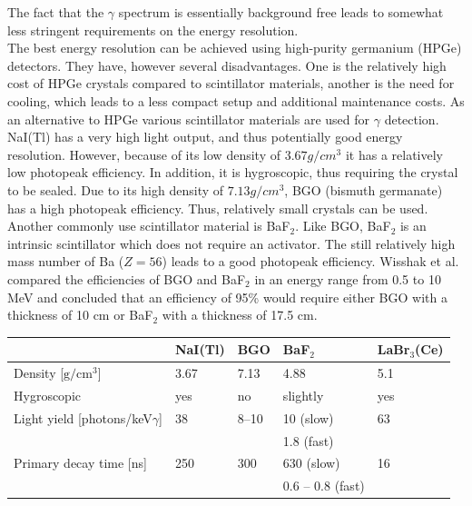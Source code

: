 The fact that the $\gamma$ spectrum is essentially background free leads to somewhat less stringent requirements on the energy resolution. \\
The best energy resolution can be achieved using high-purity germanium (HPGe) detectors. They have, however several disadvantages. One is the relatively high cost of HPGe crystals compared to scintillator materials, another is the need for cooling, which leads to a less compact setup and additional maintenance costs. As an alternative to HPGe various scintillator materials are used for $\gamma$ detection. NaI(Tl) has a very high light output, and thus potentially good energy resolution. However, because of its low density of $3.67\unit{g/cm^3}$ it has a relatively low photopeak efficiency. In addition, it is hygroscopic, thus requiring the crystal to be sealed. Due to its high density of $7.13 \unit{g/cm^3}$, BGO (bismuth germanate) has a high photopeak efficiency. Thus, relatively small crystals can be used. Another commonly use scintillator material is BaF$_2$. Like BGO, BaF$_2$ is an intrinsic scintillator which does not require an activator. The still relatively high mass number of Ba ($Z = 56$) leads to a good photopeak efficiency. Wisshak et al. \cite{wiss84} compared the efficiencies of BGO and BaF$_2$ in an energy range from 0.5 to 10 MeV and concluded that an efficiency of 95\% would require either BGO with a thickness of 10 cm or BaF$_2$ with a thickness of 17.5 cm.

\begin{table}
\centering
\begin{tabular}{l|llll}
\hline
 & NaI(Tl) & BGO & BaF$_2$ & LaBr$_3$(Ce) \\
\hline
Density [$\mathrm{g/cm^3}$] & 3.67  & 7.13 & 4.88 & 5.1 \\
Hygroscopic & yes & no & slightly & yes\\
Light yield [photons/keV$\gamma$] & 38 & 8--10 & 10 (slow) & 63 \\
                                  &    &       & 1.8 (fast) &\\
Primary decay time [ns] & 250 & 300 & 630 (slow)  & 16\\
                        &     &     & 0.6 -- 0.8 (fast) &\\
\hline
\end{tabular}
\end{table}


